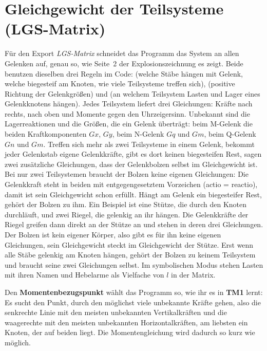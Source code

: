 \section{Gleichgewicht der Teilsysteme (LGS-Matrix)}\label{sec:mathe-gleichgewicht}

Für den Export \emph{LGS-Matrix} schneidet das Programm das System an allen Gelenken auf, genau
so, wie Seite~2 der Explosionszeichnung es zeigt. Beide benutzen dieselben drei Regeln im Code:
 (welche Stäbe hängen mit Gelenk, welche biegesteif am Knoten, wie viele
Teilsysteme treffen sich),  (positive Richtung der Gelenkgrößen) und
 (an welchem Teilsystem Lasten und Lager eines Gelenkknotens hängen). Jedes
Teilsystem liefert drei Gleichungen: Kräfte nach rechts, nach oben und Momente gegen den
Uhrzeigersinn. Unbekannt sind die Lagerreaktionen und die Größen, die ein Gelenk überträgt: beim
M-Gelenk die beiden Kraftkomponenten $Gx$, $Gy$, beim N-Gelenk $Gq$ und $Gm$, beim Q-Gelenk $Gn$
und $Gm$. Treffen sich mehr als zwei Teilsysteme in einem Gelenk, bekommt jeder Gelenkstab eigene
Gelenkkräfte, gibt es dort keinen biegesteifen Rest, sagen zwei zusätzliche Gleichungen, dass der
Gelenkbolzen selbst im Gleichgewicht ist. Bei nur zwei Teilsystemen braucht der Bolzen keine
eigenen Gleichungen: Die Gelenkkraft steht in beiden mit entgegengesetztem Vorzeichen (actio =
reactio), damit ist sein Gleichgewicht schon erfüllt. Hängt am Gelenk ein biegesteifer Rest, gehört
der Bolzen zu ihm. Ein Beispiel ist eine Stütze, die durch den Knoten durchläuft, und zwei Riegel,
die gelenkig an ihr hängen. Die Gelenkkräfte der Riegel greifen dann direkt an der Stütze an und
stehen in deren drei Gleichungen. Der Bolzen ist kein eigener Körper, also gibt es für ihn keine
eigenen Gleichungen, sein Gleichgewicht steckt im Gleichgewicht der Stütze. Erst wenn alle Stäbe
gelenkig am Knoten hängen, gehört der Bolzen zu keinem Teilsystem und braucht seine zwei
Gleichungen selbst. Im symbolischen Modus stehen Lasten mit ihren Namen und
Hebelarme als Vielfache von $l$ in der Matrix.

Den \textbf{Momentenbezugspunkt} wählt das Programm so, wie ihr es in \textbf{TM1} lernt: Es
sucht den Punkt, durch den möglichst viele unbekannte Kräfte gehen, also die senkrechte Linie mit den
meisten unbekannten Vertikalkräften und die waagerechte mit den meisten unbekannten
Horizontalkräften, am liebsten ein Knoten, der auf beiden liegt. Die Momentengleichung wird dadurch
so kurz wie möglich.

